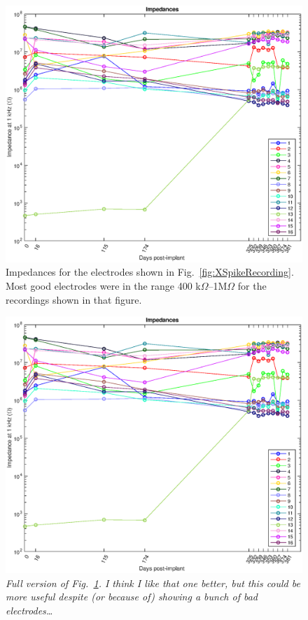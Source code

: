 \documentclass[10pt,letterpaper]{article}
\newcommand\fig[1]{Fig.~\ref{#1}}
\begin{document}
\begin{figure}
  \includegraphics[width=\textwidth]{Impedances}
  \caption{Impedances for the electrodes shown in \fig{fig:XSpikeRecording}.  Most good electrodes were in the range 400 k$\Omega$--1M$\Omega$ for the recordings shown in that figure.}
  \label{fig:Impedances}
\end{figure}


\begin{figure}
  \includegraphics[width=\textwidth]{Impedances-all}
  \caption{{\em Full version of \fig{fig:Impedances}.  I think I like that one better, but this could be more useful despite (or because of) showing a bunch of bad electrodes\dots}}
  \label{fig:Impedances-all}
\end{figure}
\end{document}
